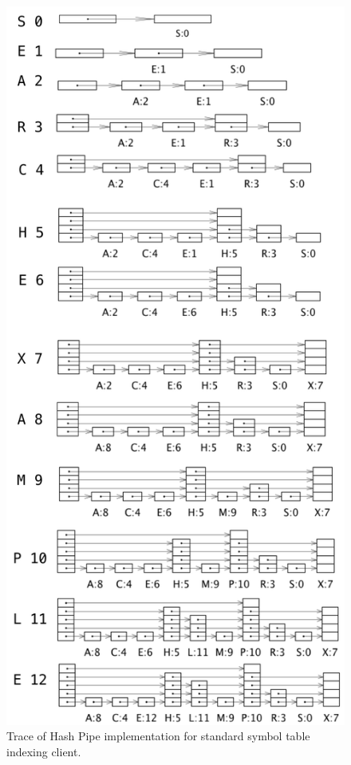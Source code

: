 \documentclass{tufte-handout}
\begin{document}
\begin{figure}
  \includegraphics{img/fig2.png}
  \caption{Trace of Hash Pipe implementation for standard symbol table indexing client.}
\end{figure}
\end{document}
